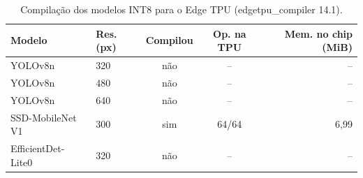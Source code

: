 \begin{table}[t]
\centering
\footnotesize
\caption{Compilação dos modelos INT8 para o Edge TPU (edgetpu\_compiler 14.1).}
\label{tab:edgetpu}
\setlength{\tabcolsep}{3pt}
\begin{tabular}{@{}llccr@{}}
\toprule
Modelo & {Res. (px)} & Compilou & {Op. na TPU} & {Mem. no chip (MiB)} \\
\midrule
YOLOv8n & 320 & não & -- & {--} \\
YOLOv8n & 480 & não & -- & {--} \\
YOLOv8n & 640 & não & -- & {--} \\
SSD-MobileNet V1 & 300 & sim & 64/64 & 6,99 \\
EfficientDet-Lite0 & 320 & não & -- & {--} \\
\bottomrule
\end{tabular}
\end{table}
